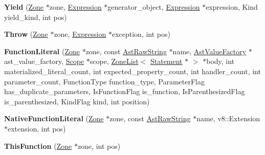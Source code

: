 \begin{DoxyCompactItemize}
\item 
\hypertarget{classv8_1_1internal_1_1_v8___f_i_n_a_l_a2247d473b58e2e47642e1f88f9b459b8}{}{\bfseries Yield} (\hyperlink{classv8_1_1internal_1_1_zone}{Zone} $\ast$zone, \hyperlink{classv8_1_1internal_1_1_expression}{Expression} $\ast$generator\+\_\+object, \hyperlink{classv8_1_1internal_1_1_expression}{Expression} $\ast$expression, Kind yield\+\_\+kind, int pos)\label{classv8_1_1internal_1_1_v8___f_i_n_a_l_a2247d473b58e2e47642e1f88f9b459b8}

\item 
\hypertarget{classv8_1_1internal_1_1_v8___f_i_n_a_l_ae9676f28a57702417b8d35a5ee653691}{}{\bfseries Throw} (\hyperlink{classv8_1_1internal_1_1_zone}{Zone} $\ast$zone, \hyperlink{classv8_1_1internal_1_1_expression}{Expression} $\ast$exception, int pos)\label{classv8_1_1internal_1_1_v8___f_i_n_a_l_ae9676f28a57702417b8d35a5ee653691}

\item 
\hypertarget{classv8_1_1internal_1_1_v8___f_i_n_a_l_a6203c671c336900a880c144b13d68652}{}{\bfseries Function\+Literal} (\hyperlink{classv8_1_1internal_1_1_zone}{Zone} $\ast$zone, const \hyperlink{classv8_1_1internal_1_1_ast_raw_string}{Ast\+Raw\+String} $\ast$name, \hyperlink{classv8_1_1internal_1_1_ast_value_factory}{Ast\+Value\+Factory} $\ast$ast\+\_\+value\+\_\+factory, \hyperlink{classv8_1_1internal_1_1_v8___f_i_n_a_l_1_1_scope}{Scope} $\ast$scope, \hyperlink{classv8_1_1internal_1_1_zone_list}{Zone\+List}$<$ \hyperlink{classv8_1_1internal_1_1_statement}{Statement} $\ast$ $>$ $\ast$body, int materialized\+\_\+literal\+\_\+count, int expected\+\_\+property\+\_\+count, int handler\+\_\+count, int parameter\+\_\+count, Function\+Type function\+\_\+type, Parameter\+Flag has\+\_\+duplicate\+\_\+parameters, Is\+Function\+Flag is\+\_\+function, Is\+Parenthesized\+Flag is\+\_\+parenthesized, Kind\+Flag kind, int position)\label{classv8_1_1internal_1_1_v8___f_i_n_a_l_a6203c671c336900a880c144b13d68652}

\item 
\hypertarget{classv8_1_1internal_1_1_v8___f_i_n_a_l_ad37aec06ef7d6d5625ecce4c787f23dc}{}{\bfseries Native\+Function\+Literal} (\hyperlink{classv8_1_1internal_1_1_zone}{Zone} $\ast$zone, const \hyperlink{classv8_1_1internal_1_1_ast_raw_string}{Ast\+Raw\+String} $\ast$name, v8\+::\+Extension $\ast$extension, int pos)\label{classv8_1_1internal_1_1_v8___f_i_n_a_l_ad37aec06ef7d6d5625ecce4c787f23dc}

\item 
\hypertarget{classv8_1_1internal_1_1_v8___f_i_n_a_l_aa5034de1948b5e26f33ab5c67483b180}{}{\bfseries This\+Function} (\hyperlink{classv8_1_1internal_1_1_zone}{Zone} $\ast$zone, int pos)\label{classv8_1_1internal_1_1_v8___f_i_n_a_l_aa5034de1948b5e26f33ab5c67483b180}


\end{DoxyCompactItemize}
